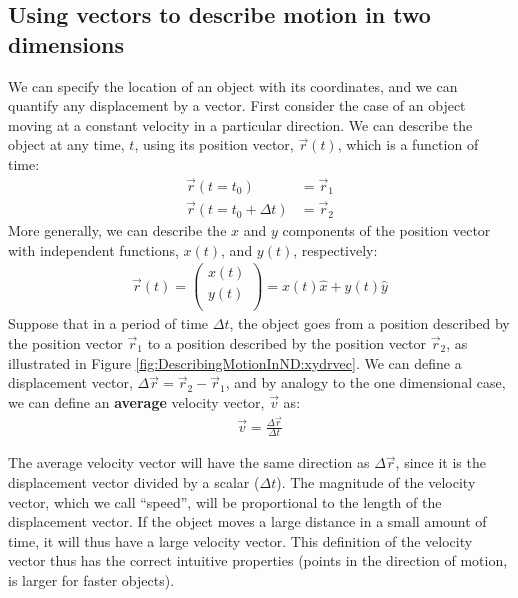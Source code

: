 \subsection{Using vectors to describe motion in two dimensions}
We can specify the location of an object with its coordinates, and we can quantify any displacement by a vector. First consider the case of an object moving at a constant velocity in a particular direction.  We can describe the object at any time, $t$, using its position vector, $\vec r(t)$, which is a function of time:
\begin{align*}
\vec r(t=t_0)&=\vec r_1\\
\vec r(t=t_0+\Delta t)&=\vec r_2
\end{align*}
More generally, we can describe the $x$ and $y$ components of the position vector with independent functions, $x(t)$, and $y(t)$, respectively:
\begin{align*}
\vec r(t) = \begin{pmatrix}
           x(t) \\
           y(t) \\
         \end{pmatrix}= x(t) \hat x + y(t) \hat y
\end{align*}
Suppose that in a period of time $\Delta t$, the object goes from a position described by the position vector $\vec r_1$ to a position described by the position vector $\vec r_2$, as illustrated in Figure \ref{fig:DescribingMotionInND:xydrvec}. We can define a displacement vector, $\Delta \vec r=\vec r_2-\vec r_1$, and by analogy to the one dimensional case, we can define an \textbf{average} velocity vector, $\vec v$ as:
\begin{align}
\vec v = \frac{\Delta \vec r}{\Delta t}
\end{align}

The average velocity vector will have the same direction as $\Delta \vec r$, since it is the displacement vector divided by a scalar ($\Delta t$). The magnitude of the velocity vector, which we call ``speed'', will be proportional to the length of the displacement vector. If the object moves a large distance in a small amount of time, it will thus have a large velocity vector. This definition of the velocity vector thus has the correct intuitive properties (points in the direction of motion, is larger for faster objects).


